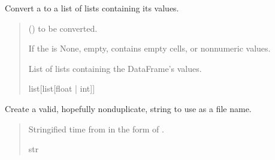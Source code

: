 \documentclass[letterpaper,10pt,english]{sphinxmanual}
\begin{document}
\begin{fulllineitems}
\label{\detokenize{FileHandler:src.FileHandler.dataframe_tolist}}
\pysigstartsignatures
{}
\pysigstopsignatures
\sphinxAtStartPar
Convert a  to a list of lists containing its values.
\begin{quote}\begin{description}
\sphinxAtStartPar
{} () \textendash{}  to be converted.

\sphinxAtStartPar
{} \textendash{} If the  is None, empty, contains empty cells, or non\sphinxhyphen{}numeric values.

\sphinxAtStartPar
List of lists containing the DataFrame’s values.

\sphinxAtStartPar
list{[}list{[}float | int{]}{]}

\end{description}\end{quote}

\end{fulllineitems}


\begin{fulllineitems}
\label{\detokenize{FileHandler:src.FileHandler.get_valid_filename}}
\pysigstartsignatures
{}
\pysigstopsignatures
\sphinxAtStartPar
Create a valid, hopefully non\sphinxhyphen{}duplicate, string to use as a file name.
\begin{quote}\begin{description}
\sphinxAtStartPar
Stringified time from  in the form of .

\sphinxAtStartPar
str

\end{description}\end{quote}

\end{fulllineitems}
\end{document}
